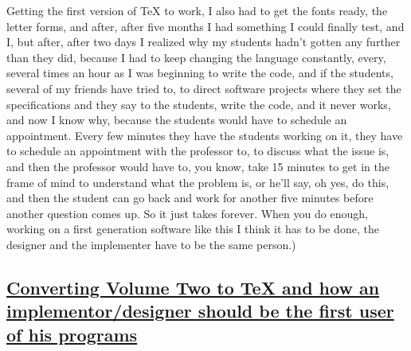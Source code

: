 \documentclass[]{article}
\begin{document}
Getting the first version of TeX to work, I also had to get the fonts
ready, the letter forms, and after, after five months I had something I
could finally test, and I, but after, after two days I realized why my
students hadn't gotten any further than they did, because I had to keep
changing the language constantly, every, several times an hour as I was
beginning to write the code, and if the students, several of my friends
have tried to, to direct software projects where they set the
specifications and they say to the students, write the code, and it
never works, and now I know why, because the students would have to
schedule an appointment. Every few minutes they have the students
working on it, they have to schedule an appointment with the professor
to, to discuss what the issue is, and then the professor would have to,
you know, take 15 minutes to get in the frame of mind to understand what
the problem is, or he'll say, oh yes, do this, and then the student can
go back and work for another five minutes before another question comes
up. So it just takes forever. When you do enough, working on a first
generation software like this I think it has to be done, the designer
and the implementer have to be the same person.)

\subsection{\texorpdfstring{\href{http://webofstories.com/play/17118}{Converting
Volume Two to TeX and how an implementor/designer should be the first
user of his
programs}}{Converting Volume Two to TeX and how an implementor/designer should be the first user of his programs}}\label{converting-volume-two-to-tex-and-how-an-implementordesigner-should-be-the-first-user-of-his-programs}
\end{document}
